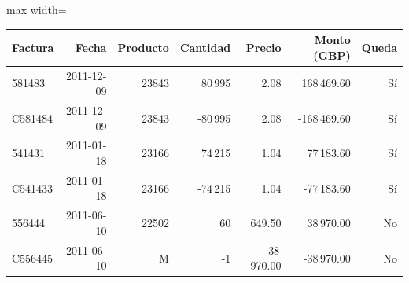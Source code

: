 \begin{center}\small\setlength{\tabcolsep}{4pt}
\begin{adjustbox}{max width=\textwidth}\begin{tabular}{lrrrrrr}
\toprule
Factura & Fecha & Producto & Cantidad & Precio & Monto (GBP) & Queda \\ \midrule
581483 & 2011-12-09 & 23843 & 80\,995 & 2.08 & 168\,469.60 & Sí \\
C581484 & 2011-12-09 & 23843 & -80\,995 & 2.08 & -168\,469.60 & Sí \\
541431 & 2011-01-18 & 23166 & 74\,215 & 1.04 & 77\,183.60 & Sí \\
C541433 & 2011-01-18 & 23166 & -74\,215 & 1.04 & -77\,183.60 & Sí \\
556444 & 2011-06-10 & 22502 & 60 & 649.50 & 38\,970.00 & No \\
C556445 & 2011-06-10 & M & -1 & 38\,970.00 & -38\,970.00 & No \\
\bottomrule\end{tabular}\end{adjustbox}\end{center}
